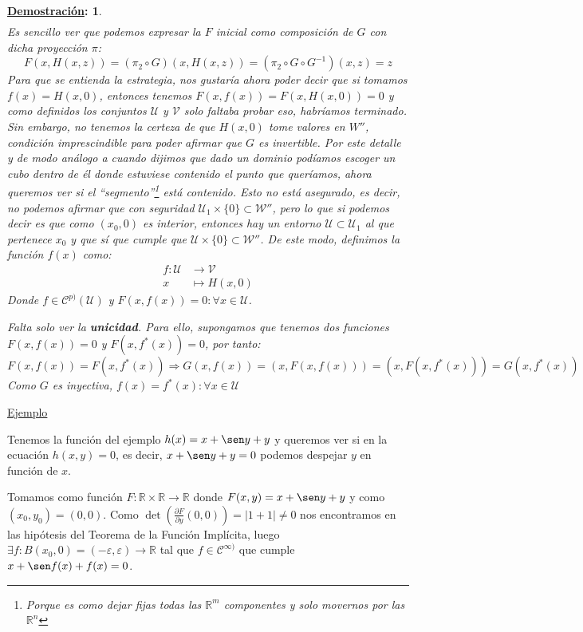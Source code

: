 \documentclass[10pt,a4paper,openright]{book}
\theoremstyle{break}
\newtheorem*{demo}{\underline{Demostración}:}
\begin{document}
\begin{demo}
\begin{align*}
\end{align*}
Es sencillo ver que podemos expresar la $F$ inicial como composición de $G$ con dicha proyección $\pi$:
$$F(x, H(x,z)) = (\pi_2 \circ G) (x, H(x,z)) = (\pi_2 \circ G \circ G^{-1}) (x,z) = z$$
Para que se entienda la estrategia, nos gustaría ahora poder decir que si tomamos $f(x)=H(x,0)$, entonces tenemos $F(x,f(x))=F(x,H(x,0))=0$ y como definidos los conjuntos $\mathcal{U}$ y $\mathcal{V}$ solo faltaba probar eso, habríamos terminado. Sin embargo, no tenemos la certeza de que $H(x,0)$ tome valores en $W''$, condición imprescindible para poder afirmar que $G$ es invertible. Por este detalle y de modo análogo a cuando dijimos que dado un dominio podíamos escoger un cubo dentro de él donde estuviese contenido el punto que queríamos, ahora queremos ver si el ``segmento''\footnote{Porque es como dejar fijas todas las $\mathbb{R}^m$ componentes y solo movernos por las $\mathbb{R}^{n}$} está contenido. Esto no está asegurado, es decir, no podemos afirmar que con seguridad $\mathcal{U}_{1}\times \{0\}\subset \mathcal{W}''$, pero lo que si podemos decir es que como $(x_0, 0)$ es interior, entonces hay un entorno $\mathcal{U}\subset \mathcal{U}_{1}$ al que pertenece $x_0$ y que sí que cumple que $\mathcal{U}\times \{0\} \subset \mathcal{W}''$. De este modo, definimos la función $f(x)$ como:
\begin{align*}
f: \mathcal{U} &\to \mathcal{V} \\ x &\mapsto H(x,0)
\end{align*} 
Donde $f \in \mathcal{C}^{p)} (\mathcal{U})$ y $F(x, f(x)) = 0 : \forall x \in \mathcal{U}$.

Falta solo ver la \textbf{unicidad}. Para ello, supongamos que tenemos dos funciones $F(x, f(x)) = 0$ y $F(x, f^* (x)) = 0$, por tanto:
$$F(x, f(x)) = F(x, f^*(x)) \Rightarrow G(x,f(x)) = (x, F(x,f(x))) = (x, F(x, f^* (x))) = G(x,f^* (x))$$
Como $G$ es inyectiva, $f(x) = f^* (x) : \forall x \in \mathcal{U}$
\end{demo}

\underline{Ejemplo}

Tenemos la función del ejemplo $h(x) = x + \sen y + y$ y queremos ver si en la ecuación $h(x,y)=0$, es decir, $x + \sen y + y = 0$ podemos despejar $y$ en función de $x$.

Tomamos como función $F: \mathbb{R} \times  \mathbb{R} \to \mathbb{R}$ donde $F(x,y) = x + \sen y + y$ y como $(x_0, y_0) = (0,0)$. Como $\det(\frac{\partial F}{\partial y} (0,0)) = |1+ 1| \neq 0$ nos encontramos en las hipótesis del Teorema de la Función Implícita, luego $\exists f : B(x_0, 0)=(-\varepsilon, \varepsilon) \to \mathbb{R}$ tal que $f \in \mathcal{C}^{\infty )}$ que cumple $x + \sen f(x) + f(x) = 0$.
\end{document}
